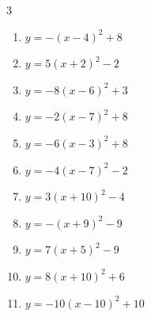 \begin{multicols}{3}
\begin{enumerate}
        \phantom{$\displaystyle 頂点\left( -3 , -9 \right)$}

  \item $\displaystyle y=-\left( x-4\right)^{2}+8$

        \phantom{$\displaystyle 頂点\left( 4 , 8 \right)$}

  \item $\displaystyle y=5\left( x+2\right)^{2}-2$

        \phantom{$\displaystyle 頂点\left( -2 , -2 \right)$}

  \item $\displaystyle y=-8\left( x-6\right)^{2}+3$

        \phantom{$\displaystyle 頂点\left( 6 , 3 \right)$}

  \item $\displaystyle y=-2\left( x-7\right)^{2}+8$

        \phantom{$\displaystyle 頂点\left( 7 , 8 \right)$}

  \item $\displaystyle y=-6\left( x-3\right)^{2}+8$

        \phantom{$\displaystyle 頂点\left( 3 , 8 \right)$}

  \item $\displaystyle y=-4\left( x-7\right)^{2}-2$

        \phantom{$\displaystyle 頂点\left( 7 , -2 \right)$}

  \item $\displaystyle y=3\left( x+10\right)^{2}-4$

        \phantom{$\displaystyle 頂点\left( -10 , -4 \right)$}

  \item $\displaystyle y=-\left( x+9\right)^{2}-9$

        \phantom{$\displaystyle 頂点\left( -9 , -9 \right)$}

  \item $\displaystyle y=7\left( x+5\right)^{2}-9$

        \phantom{$\displaystyle 頂点\left( -5 , -9 \right)$}

  \item $\displaystyle y=8\left( x+10\right)^{2}+6$

        \phantom{$\displaystyle 頂点\left( -10 , 6 \right)$}

  \item $\displaystyle y=-10\left( x-10\right)^{2}+10$

        \phantom{$\displaystyle 頂点\left( 10 , 10 \right)$}


\end{enumerate}
\end{multicols}
